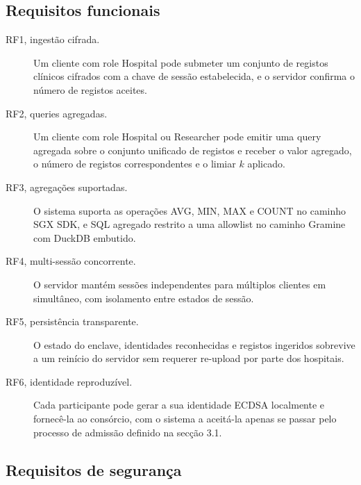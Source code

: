 \subsection{Requisitos funcionais}

\begin{description}
  \item[RF1, ingestão cifrada.] Um cliente com role Hospital pode submeter um conjunto de registos clínicos cifrados com a chave de sessão estabelecida, e o servidor confirma o número de registos aceites.
  \item[RF2, queries agregadas.] Um cliente com role Hospital ou Researcher pode emitir uma query agregada sobre o conjunto unificado de registos e receber o valor agregado, o número de registos correspondentes e o limiar $k$ aplicado.
  \item[RF3, agregações suportadas.] O sistema suporta as operações AVG, MIN, MAX e COUNT no caminho SGX SDK, e SQL agregado restrito a uma allowlist no caminho Gramine com DuckDB embutido.
  \item[RF4, multi-sessão concorrente.] O servidor mantém sessões independentes para múltiplos clientes em simultâneo, com isolamento entre estados de sessão.
  \item[RF5, persistência transparente.] O estado do enclave, identidades reconhecidas e registos ingeridos sobrevive a um reinício do servidor sem requerer re-upload por parte dos hospitais.
  \item[RF6, identidade reproduzível.] Cada participante pode gerar a sua identidade ECDSA localmente e fornecê-la ao consórcio, com o sistema a aceitá-la apenas se passar pelo processo de admissão definido na secção 3.1.
\end{description}

\subsection{Requisitos de segurança}

